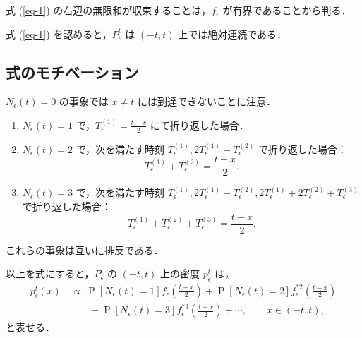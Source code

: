 \documentclass[
]{article}
\providecommand{\tightlist}{%
  \setlength{\itemsep}{0pt}\setlength{\parskip}{0pt}}\usepackage{longtable,booktabs,array}
\renewcommand{\labelenumi}{(\arabic{enumi})} %
\theoremstyle{StatementsWithUnderline}\newtheorem{theorem}{定理}[section]\newtheorem{definition}[theorem]{定義}\newtheorem{corollary}[theorem]{系}\newtheorem{proposition}[theorem]{命題}\newtheorem{lemma}[theorem]{補題}\newtheorem{example}[theorem]{例}
\theoremstyle{definition}\newtheorem{notation}[theorem]{記法}\newtheorem{algorithm}[theorem]{算譜}\newtheorem{remarks}[theorem]{要諦}\newtheorem{remark}[theorem]{注}
\begin{document}
式 (\ref{eq-1}) の右辺の無限和が収束することは，\(f_\epsilon\)
が有界であることから判る．

式 (\ref{eq-1}) を認めると，\(P^t_\epsilon\) は \((-t,t)\)
上では絶対連続である．

\subsection{式のモチベーション}\label{ux5f0fux306eux30e2ux30c1ux30d9ux30fcux30b7ux30e7ux30f3}

\begin{tcolorbox}[enhanced jigsaw, titlerule=0mm, arc=.35mm, title={\(t\) 時間後に \(x\in(-t,t)\) に居る場合}, breakable, colback=white, opacityback=0, left=2mm, toprule=.15mm, colbacktitle=quarto-callout-tip-color!10!white, leftrule=.75mm, opacitybacktitle=0.6, bottomtitle=1mm, toptitle=1mm, coltitle=black, bottomrule=.15mm, rightrule=.15mm, colframe=quarto-callout-tip-color-frame]

\(N_\epsilon(t)=0\) の事象では \(x\ne t\) には到達できないことに注意．

\begin{enumerate}
\def\labelenumi{\arabic{enumi}.}
\tightlist
\item
  \(N_\epsilon(t)=1\)
  で，\(\displaystyle T_\epsilon^{(1)}=\frac{t+x}{2}\)
  にて折り返した場合．
\item
  \(N_\epsilon(t)=2\) で，次を満たす時刻
  \(T_\epsilon^{(1)},2T_\epsilon^{(1)}+T_\epsilon^{(2)}\)
  で折り返した場合： \[
    T_\epsilon^{(1)}+T_\epsilon^{(2)}=\frac{t-x}{2}.
    \]
\item
  \(N_\epsilon(t)=3\) で，次を満たす時刻
  \(T_\epsilon^{(1)},2T_\epsilon^{(1)}+T_\epsilon^{(2)},2T_\epsilon^{(1)}+2T_\epsilon^{(2)}+T_\epsilon^{(3)}\)
  で折り返した場合： \[
    T_\epsilon^{(1)}+T_\epsilon^{(2)}+T_\epsilon^{(3)}=\frac{t+x}{2}.
    \]
\end{enumerate}

これらの事象は互いに排反である．

\end{tcolorbox}

以上を式にすると，\(P^t_\epsilon\) の \((-t,t)\) 上の密度
\(p_\epsilon^t\) は， \begin{align*}
  p^t_\epsilon(x)&\,\propto\,\operatorname{P}[N_\epsilon(t)=1]f_\epsilon\left(\frac{t+x}{2}\right)+\operatorname{P}[N_\epsilon(t)=2]f^{*2}_\epsilon\left(\frac{t-x}{2}\right)\\
  &\qquad +\operatorname{P}[N_\epsilon(t)=3]f^{*3}_\epsilon\left(\frac{t+x}{2}\right)+\cdots,\qquad x\in(-t,t),
\end{align*} と表せる．
\end{document}
